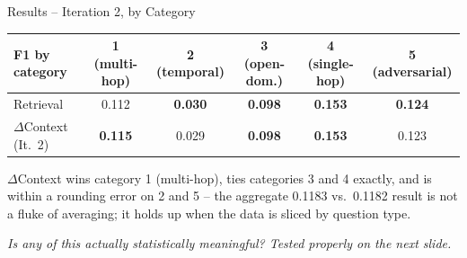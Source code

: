 \documentclass[aspectratio=169]{beamer}
\begin{document}
\begin{frame}{Results -- Iteration 2, by Category}
    \begin{table}
    \centering
    \begin{tabular}{lccccc}
    \toprule
    F1 by category & 1 (multi-hop) & 2 (temporal) & 3 (open-dom.) & 4 (single-hop) & 5 (adversarial) \\
    \midrule
    Retrieval & 0.112 & \textbf{0.030} & \textbf{0.098} & \textbf{0.153} & \textbf{0.124} \\
    $\Delta$Context (It.\ 2) & \textbf{0.115} & 0.029 & \textbf{0.098} & \textbf{0.153} & 0.123 \\
    \bottomrule
    \end{tabular}
    \end{table}

    \vspace{0.4cm}
    $\Delta$Context wins category 1 (multi-hop), ties categories 3 and 4 exactly, and is within a rounding error on 2 and 5 -- the aggregate 0.1183 vs.\ 0.1182 result is not a fluke of averaging; it holds up when the data is sliced by question type.

    \vspace{0.3cm}
    \textit{Is any of this actually statistically meaningful? Tested properly on the next slide.}
\end{frame}
\end{document}
